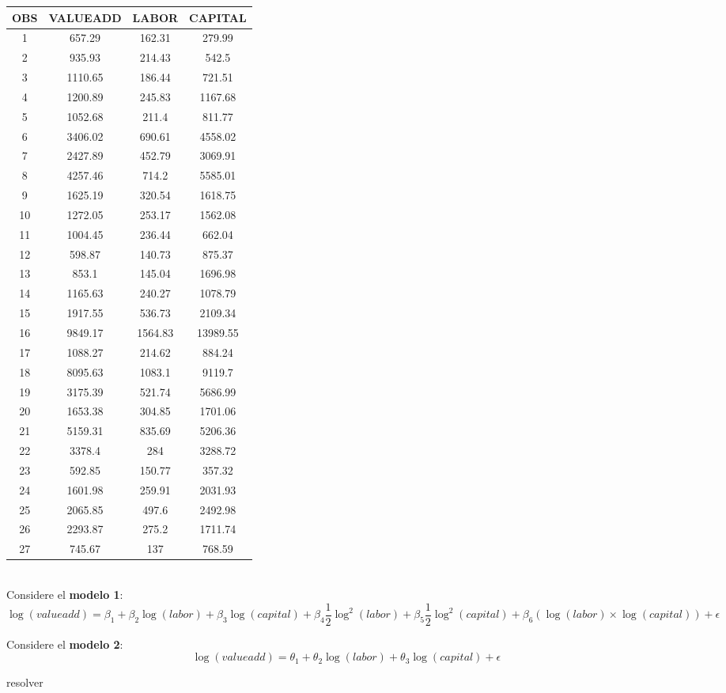 \documentclass[12pt,a4paper]{report}
\begin{document}
\begin{tabular}{| c | c | c | c |}
\hline
OBS&VALUEADD&LABOR&CAPITAL\\ \hline
1&657.29&162.31&279.99\\
2&935.93&214.43&542.5\\
3&1110.65&186.44&721.51\\
4&1200.89&245.83&1167.68\\
5&1052.68&211.4&811.77\\
6&3406.02&690.61&4558.02\\
7&2427.89&452.79&3069.91\\
8&4257.46&714.2&5585.01\\
9&1625.19&320.54&1618.75\\
10&1272.05&253.17&1562.08\\
11&1004.45&236.44&662.04\\
12&598.87&140.73&875.37\\
13&853.1&145.04&1696.98\\
14&1165.63&240.27&1078.79\\
15&1917.55&536.73&2109.34\\
16&9849.17&1564.83&13989.55\\
17&1088.27&214.62&884.24\\
18&8095.63&1083.1&9119.7\\
19&3175.39&521.74&5686.99\\
20&1653.38&304.85&1701.06\\
21&5159.31&835.69&5206.36\\
22&3378.4&284&3288.72\\
23&592.85&150.77&357.32\\
24&1601.98&259.91&2031.93\\
25&2065.85&497.6&2492.98\\
26&2293.87&275.2&1711.74\\
27&745.67&137&768.59\\
\hline
\end{tabular}
\\

\noindent Considere el \textbf{modelo 1}: 
{\footnotesize
\[ \log(valueadd) = \beta_1 + \beta_2 \log(labor)+ \beta_3 \log(capital) + \beta_4\frac{1}{2}\log^2(labor) + \beta_5\frac{1}{2}\log^2(capital) + \beta_6(\log(labor)\times \log(capital)) + \epsilon \]}

\noindent Considere el \textbf{modelo 2}: 
{\footnotesize
\[ \log(valueadd) = \theta_1 + \theta_2 \log(labor) + \theta_3 \log(capital) + \epsilon  \]
}

resolver
\end{document}

